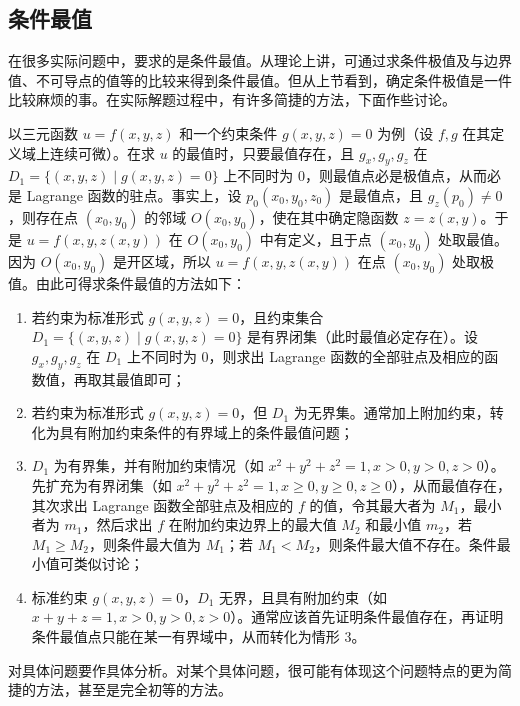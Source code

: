 \subsection{条件最值}

在很多实际问题中，要求的是条件最值。从理论上讲，可通过求条件极值及与边界值、不可导点的值等的比较来得到条件最值。但从上节看到，确定条件极值是一件比较麻烦的事。在实际解题过程中，有许多简捷的方法，下面作些讨论。

以三元函数 $u=f(x,y,z)$ 和一个约束条件 $g(x,y,z)=0$ 为例（设 $f,g$ 在其定义域上连续可微）。在求 $u$ 的最值时，只要最值存在，且 $g_x,g_y,g_z$ 在 $D_1=\{(x,y,z)\mid g(x,y,z)=0\}$ 上不同时为 $0$，则最值点必是极值点，从而必是 Lagrange 函数的驻点。事实上，设 $p_0(x_0,y_0,z_0)$ 是最值点，且 $g_z(p_0)\ne0$，则存在点 $(x_0,y_0)$ 的邻域 $O(x_0,y_0)$，使在其中确定隐函数 $z=z(x,y)$。于是 $u=f(x,y,z(x,y))$ 在 $O(x_0,y_0)$ 中有定义，且于点 $(x_0,y_0)$ 处取最值。因为 $O(x_0,y_0)$ 是开区域，所以 $u=f(x,y,z(x,y))$ 在点 $(x_0,y_0)$ 处取极值。由此可得求条件最值的方法如下：
\begin{enumerate}[label=\arabic*.]
  \item 若约束为标准形式 $g(x,y,z)=0$，且约束集合 $D_1=\{(x,y,z)\mid g(x,y,z)=0\}$ 是有界闭集（此时最值必定存在）。设 $g_x,g_y,g_z$ 在 $D_1$ 上不同时为 $0$，则求出 Lagrange 函数的全部驻点及相应的函数值，再取其最值即可；
  \item 若约束为标准形式 $g(x,y,z)=0$，但 $D_1$ 为无界集。通常加上附加约束，转化为具有附加约束条件的有界域上的条件最值问题；
  \item $D_1$ 为有界集，并有附加约束情况（如 $x^2+y^2+z^2=1,x>0,y>0,z>0$）。先扩充为有界闭集（如 $x^2+y^2+z^2=1,x\ge0,y\ge0,z\ge0$），从而最值存在，其次求出 Lagrange 函数全部驻点及相应的 $f$ 的值，令其最大者为 $M_1$，最小者为 $m_1$，然后求出 $f$ 在附加约束边界上的最大值 $M_2$ 和最小值 $m_2$，若 $M_1\ge M_2$，则条件最大值为 $M_1$；若 $M_1<M_2$，则条件最大值不存在。条件最小值可类似讨论；
  \item 标准约束 $g(x,y,z)=0$，$D_1$ 无界，且具有附加约束（如 $x+y+z=1,x>0,y>0,z>0$）。通常应该首先证明条件最值存在，再证明条件最值点只能在某一有界域中，从而转化为情形 3。
\end{enumerate}

\begin{xremark}
对具体问题要作具体分析。对某个具体问题，很可能有体现这个问题特点的更为简捷的方法，甚至是完全初等的方法。
\end{xremark}

